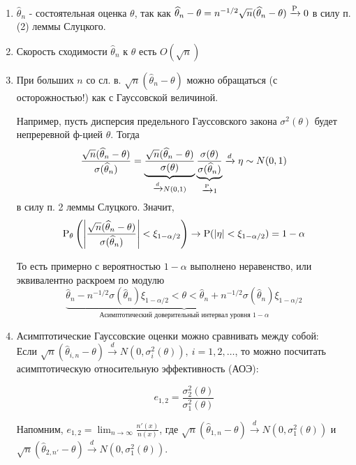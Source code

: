 \begin{enumerate}
    \item \(\widehat{\theta}_n\) - состоятельная оценка \(\theta\), так как \(\widehat{\theta}_n - \theta = n^{-1/2} \sqrt{n}(\widehat{\theta}_n - \theta) \xrightarrow{\P} 0\)
        в силу п. (2) леммы Слуцкого.
    \item Скорость сходимости \(\widehat{\theta}_n\) к \(\theta\) есть \(O(\sqrt{n})\)
    \item При больших \(n\) со сл. в. \(\sqrt{n}(\widehat{\theta}_n - \theta)\) можно обращаться (с осторожностью!) как с Гауссовской величиной.

    Например, пусть дисперсия предельного Гауссовского закона \(\sigma^2(\theta)\) будет непреревной ф-цией \(\theta\). Тогда
    \[ \frac{\sqrt{n}(\widehat{\theta}_n - \theta)}{\sigma(\widehat{\theta}_n)} =
    \underbrace{\frac{\sqrt{n}(\widehat{\theta}_n - \theta)}{\sigma(\theta)}}_{\xrightarrow{d} N(0, 1)}
    \underbrace{\frac{\sigma(\theta)}{\sigma(\widehat{\theta}_n)}}_{\xrightarrow{\P} 1} \xrightarrow{d} \eta \sim N(0, 1)\]
    в силу п. 2 леммы Слуцкого. Значит,
    \[\P_\theta \left(\left\lvert \frac{\sqrt{n}(\widehat{\theta}_n - \theta)}{\sigma(\widehat{\theta}_n)} \right\rvert  < \xi_{1 - \alpha/2}\right) \rightarrow \P(\left\lvert \eta \right\rvert  < \xi_{1 - \alpha/2}) = 1 - \alpha\]

    То есть примерно с вероятностью \(1 - \alpha\) выполнено неравенство, или эквивалентно раскроем по модулю
    \[\underbrace{\widehat{\theta}_n - n^{-1/2}\sigma(\widehat{\theta}_n)\xi_{1 - \alpha /2} < \theta < \widehat{\theta}_n + n^{-1/2}\sigma(\widehat{\theta}_n)\xi_{1 - \alpha /2}}_{\mbox{Асимптотический доверительный интервал уровня \(1 - \alpha\)}}\]

    \item Асимптотические Гауссовские оценки можно сравнивать между собой: \\
    Если \(\sqrt{n} (\widehat{\theta}_{i,n} - \theta) \xrightarrow{d} N(0, \sigma^2_{i}(\theta)),\ i = 1, 2, \ldots\), то
    можно посчитать асимптотическую относительную эффективность (АОЭ):

    \[e_{1,2} = \frac{\sigma_2^2(\theta)}{\sigma_1^2(\theta)}\]

    Напомним, $e_{1, 2} = \lim_{n \to \infty} \frac{n'(x)}{n (x)}$, где
    $\sqrt{n}(\widehat{\theta}_{1,n}-\theta)\xrightarrow{d}N(0, \sigma_1^2(\theta))$
    и \(\sqrt{n}(\widehat{\theta}_{2,n'} - \theta) \xrightarrow{d} N(0, \sigma_1^2(\theta))\).

\end{enumerate}

